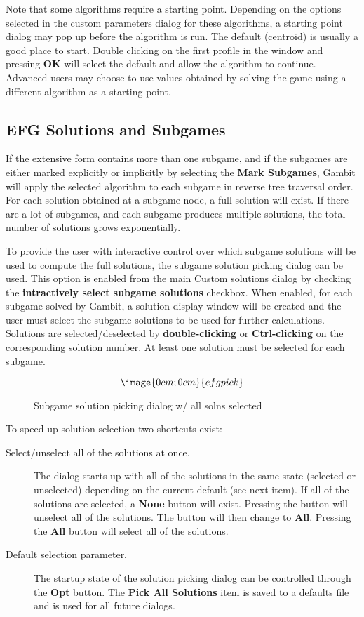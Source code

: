 Note that some algorithms require a starting point.  Depending on the
options selected in the custom parameters dialog for these algorithms,
a starting point dialog may pop up before the algorithm is run.  The
default (centroid) is usually a good place to start.  Double clicking
on the first profile in the window and pressing {\bf OK} will select
the default and allow the algorithm to continue.  Advanced users may
choose to use values obtained by solving the game using a different
algorithm as a starting point.

\subsection{EFG Solutions and Subgames}\label{EFGSolnSubg}
If the extensive form contains more than one subgame, and if the
subgames are either marked explicitly or implicitly by selecting the 
{\bf Mark Subgames}, Gambit will apply the selected algorithm to each
subgame in reverse tree traversal order.  For each solution obtained
at a subgame node, a full solution will exist.  If there are a lot of
subgames, and each subgame produces multiple solutions, the total
number of solutions grows exponentially.

To provide the user with interactive control over which subgame
solutions will be used to compute the full solutions, the subgame
solution picking dialog can be used.  This option is enabled from the
main Custom solutions dialog by checking the {\bf intractively select
subgame solutions} checkbox.  When enabled, for each subgame solved by
Gambit, a solution display window will be created and the user must
select the subgame solutions to be used for further calculations.
Solutions are selected/deselected by {\bf double-clicking} or {\bf 
Ctrl-clicking} on the corresponding solution number.  At least one
solution must be selected for each subgame.

\begin{figure}
$$\image{0cm;0cm}{efgpick}$$
\caption{Subgame solution picking dialog w/ all solns selected}\label{fig_efgpick}
\end{figure}

To speed up solution selection two shortcuts exist:

\begin{description}
\item[Select/unselect all of the solutions at once.]  The dialog
starts up with all of the solutions in the same state (selected or
unselected) depending on the current default (see next item).  If all
of the solutions are selected, a {\bf None} button will exist.
Pressing the button will unselect all of the solutions.  The button
will then change to {\bf All}.  Pressing the {\bf All} button will
select all of the solutions.
\item[Default selection parameter.]  The startup state of the solution
picking dialog can be controlled through the {\bf Opt} button.  The
{\bf Pick All Solutions} item is saved to a defaults file and is used
for all future dialogs.
\end{description}

